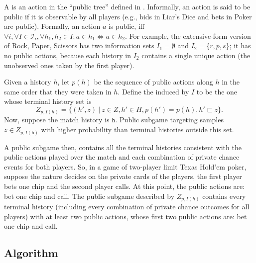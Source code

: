 \documentclass{aamas2015}
\newcommand{\cI}{\mathcal{I}}
\newcommand{\tth}{\mathtt{h}}
\newcommand{\defword}[1]{\textbf{\boldmath{#1}}}
\begin{document}
A \defword{public action} is an action in the ``public tree'' defined in \cite{12aamas-pcs}. Informally, an action is said to be public if it is observable by all players (e.g., bids in Liar's Dice and bets in Poker are public). Formally, an action $a$ is public, iff 
$\forall i, \forall I \in \cI_i, \forall h_1,h_2\in I: a\in h_1 \Leftrightarrow a\in h_2$.
For example, the extensive-form version of Rock, Paper, Scissors has two information 
sets $I_1 = \emptyset$ and $I_2 = \{ r, p, s \}$; it has no public actions, because each history in 
$I_2$ contains a single unique action (the unobserved ones taken by the first player).  

Given a history $h$, let $p(h)$ be the sequence of public actions along $h$ in the same order that they were taken in $h$. 
Define the \defword{public subgame} induced by $I$ to be the one whose terminal history set is
\[Z_{p,I(h)} = \{(h',z)~|~z \in Z, h' \in H, p(h') = p(h), h' \sqsubset z \}.\]
Now, suppose the match history is $\tth$.
Public subgame targeting samples $z \in Z_{p,I(\tth)}$ with higher probability than terminal histories outside this set.

A public subgame then, contains all the terminal histories consistent with the public actions played over the match and
each combination of private chance events for both players. So, in a game of two-player limit Texas Hold'em poker, suppose the nature decides on the private cards of the players,
the first player bets one chip and the second player calls. At this point, the public actions are: bet one chip and call. 
The public subgame described by $Z_{p,I(h)}$ contains every terminal history (including every combination of private chance 
outcomes for all players) with at least two public actions, whose first two public actions are: bet one chip and call.  

\subsection{Algorithm}
\end{document}
